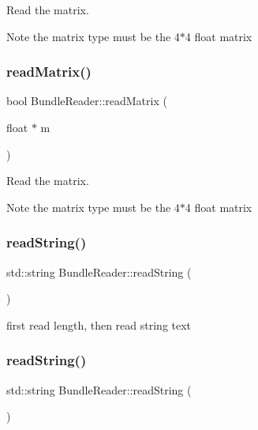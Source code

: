 Read the matrix. \begin{DoxyNote}{Note}
the matrix type must be the 4$\ast$4 float matrix 
\end{DoxyNote}
\mbox{\label{classBundleReader_a50ad5f05a615c668967da07e1345d931}} 
\subsubsection{\texorpdfstring{read\+Matrix()}{readMatrix()}\hspace{0.1cm}{\footnotesize\ttfamily [2/2]}}
{\footnotesize\ttfamily bool Bundle\+Reader\+::read\+Matrix (\begin{DoxyParamCaption}\item[{float $\ast$}]{m }\end{DoxyParamCaption})}

Read the matrix. \begin{DoxyNote}{Note}
the matrix type must be the 4$\ast$4 float matrix 
\end{DoxyNote}
\mbox{\label{classBundleReader_aae1069e8afb7ede1bcdec1475785975b}} 
\subsubsection{\texorpdfstring{read\+String()}{readString()}\hspace{0.1cm}{\footnotesize\ttfamily [1/2]}}
{\footnotesize\ttfamily std\+::string Bundle\+Reader\+::read\+String (\begin{DoxyParamCaption}{ }\end{DoxyParamCaption})}

first read length, then read string text \mbox{\label{classBundleReader_aae1069e8afb7ede1bcdec1475785975b}} 
\subsubsection{\texorpdfstring{read\+String()}{readString()}\hspace{0.1cm}{\footnotesize\ttfamily [2/2]}}
{\footnotesize\ttfamily std\+::string Bundle\+Reader\+::read\+String (\begin{DoxyParamCaption}{ }\end{DoxyParamCaption})}

